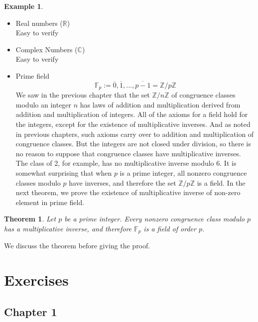 \documentclass[
]{book}
\providecommand{\tightlist}{%
  \setlength{\itemsep}{0pt}\setlength{\parskip}{0pt}}
\newtheorem{theorem}{Theorem}[chapter]
\theoremstyle{definition}
\theoremstyle{definition}
\newtheorem{example}{Example}[chapter]
\theoremstyle{definition}
\theoremstyle{definition}
\theoremstyle{remark}
\begin{document}
\begin{example}
\protect\hypertarget{exm:unnamed-chunk-82}{}\label{exm:unnamed-chunk-82}\leavevmode

\begin{itemize}
\tightlist
\item
  Real numbers (\(\mathbb{R}\))\\
  Easy to verify
\item
  Complex Numbers (\(\mathbb{C}\))\\
  Easy to verify
\item
  Prime field
  \[\mathbb{F}_p:={\overline{0},\overline{1},...,\overline{p-1}}=\mathbb{Z}/p\mathbb{Z}\]
  We saw in the previous chapter that the set \(\mathbb{Z}/n\mathbb{Z}\) of congruence classes modulo an integer \(n\) has laws of addition and multiplication derived from addition and multiplication of integers. All of the axioms for a field hold for the integers, except for the existence of multiplicative inverses. And as noted in previous chapters, such axioms carry over to addition and multiplication of congruence classes. But the integers are not closed under division, so there is no reason to suppose that congruence classes have multiplicative inverses. The class of 2, for example, has no multiplicative inverse modulo \(6\). It is somewhat surprising that when \(p\) is a prime integer, all nonzero congruence classes modulo \(p\) have inverses, and therefore the set \(\mathbb{Z}/ p \mathbb{Z}\) is a field. In the next theorem, we prove the existence of multiplicative inverse of non-zero element in prime field.
\end{itemize}

\end{example}

\begin{theorem}
\protect\hypertarget{thm:unnamed-chunk-83}{}\label{thm:unnamed-chunk-83}Let \(p\) be a prime integer. Every nonzero congruence class modulo \(p\) has a multiplicative inverse, and therefore \(\mathbb{F}_p\) is a field of order \(p\).
\end{theorem}

We discuss the theorem before giving the proof.

\hypertarget{exercises}{%
\chapter{Exercises}\label{exercises}}

\hypertarget{chapter-1}{%
\section{Chapter 1}\label{chapter-1}}
\end{document}
